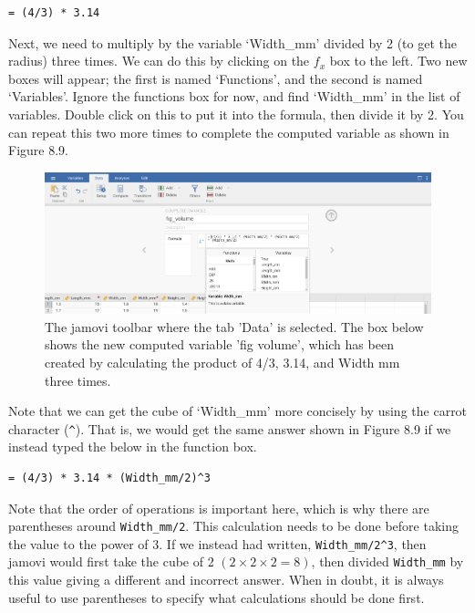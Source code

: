 \documentclass[
]{scrbook}
\begin{document}
\begin{verbatim}
= (4/3) * 3.14
\end{verbatim}

Next, we need to multiply by the variable `Width\_mm' divided by 2 (to get the radius) three times.
We can do this by clicking on the \(f_{x}\) box to the left.
Two new boxes will appear; the first is named `Functions', and the second is named `Variables'.
Ignore the functions box for now, and find `Width\_mm' in the list of variables.
Double click on this to put it into the formula, then divide it by 2.
You can repeat this two more times to complete the computed variable as shown in Figure 8.9.

\begin{figure}
\includegraphics[width=1\linewidth]{img/jamovi_compute_new_variable} \caption{The jamovi toolbar where the tab 'Data' is selected. The box below shows the new computed variable 'fig volume', which has been created by calculating the product of 4/3, 3.14, and Width mm three times.}\label{fig:unnamed-chunk-32}
\end{figure}

Note that we can get the cube of `Width\_mm' more concisely by using the carrot character (\texttt{\^{}}).
That is, we would get the same answer shown in Figure 8.9 if we instead typed the below in the function box.

\begin{verbatim}
= (4/3) * 3.14 * (Width_mm/2)^3
\end{verbatim}

Note that the order of operations is important here, which is why there are parentheses around \texttt{Width\_mm/2}. This calculation needs to be done before taking the value to the power of 3.
If we instead had written, \texttt{Width\_mm/2\^{}3}, then jamovi would first take the cube of 2 \((2 \times 2 \times 2 = 8)\), then divided \texttt{Width\_mm} by this value giving a different and incorrect answer.
When in doubt, it is always useful to use parentheses to specify what calculations should be done first.
\end{document}
